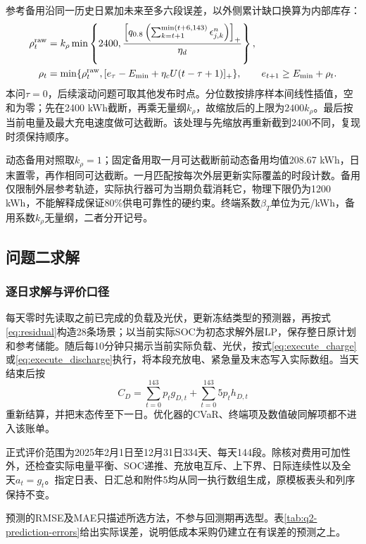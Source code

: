 参考备用沿同一历史日累加未来至多六段误差，以外侧累计缺口换算为内部库存：
\begin{align}
 \rho_t^{\rm raw}
 &=k_\rho\min\left\{2400,
 \frac{\left[q_{0.8}\left(\sum_{k=t+1}^{\min(t+6,143)}
             \epsilon^n_{j,k}\right)\right]_+}{\eta_d}\right\},
 \label{eq:reserve}\\
 \rho_t&=\min\{\rho_t^{\rm raw},
 [e_\tau-E_{\min}+\eta_cU(t-\tau+1)]_+\},\qquad
 e_{t+1}\ge E_{\min}+\rho_t.
 \label{eq:reachable_reserve}
\end{align}
本问$\tau=0$，后续滚动问题可取其他发布时点。分位数按排序样本间线性插值，空和为零；先在2400 kWh截断，再乘无量纲$k_\rho$，故缩放后的上限为$2400k_\rho$。最后按当前电量及最大充电速度做可达截断。该处理与先缩放再重新截到2400不同，复现时须保持顺序。

动态备用对照取$k_\rho=1$；固定备用取一月可达截断前动态备用均值208.67 kWh，日末置零，再作相同可达截断。一月匹配按每次外层更新实际覆盖的时段计数。备用仅限制外层参考轨迹，实际执行器可为当期负载消耗它，物理下限仍为1200 kWh，不能解释成保证80\%供电可靠性的硬约束。终端系数$\beta_T$单位为元/kWh，备用系数$k_\rho$无量纲，二者分开记号。

\subsection{问题二求解}

\subsubsection{逐日求解与评价口径}

每天零时先读取之前已完成的负载及光伏，更新冻结类型的预测器，再按式\eqref{eq:residual}构造28条场景；以当前实际SOC为初态求解外层LP，保存整日原计划和参考储能。随后每10分钟只揭示当前实际负载、光伏，按式\eqref{eq:execute_charge}或\eqref{eq:execute_discharge}执行，将本段充放电、紧急量及末态写入实际数组。当天结束后按
\begin{equation}
 C_D=\sum_{t=0}^{143}p_tg_{D,t}+\sum_{t=0}^{143}5p_th_{D,t}
 \label{eq:q2_actual_bill}
\end{equation}
重新结算，并把末态传至下一日。优化器的CVaR、终端项及数值破同解项都不进入该账单。

正式评价范围为2025年2月1日至12月31日334天、每天144段。除核对费用可加性外，还检查实际电量平衡、SOC递推、充放电互斥、上下界、日际连续性以及全天$a_t=g_t$。指定日表、日汇总和附件5均从同一执行数组生成，原模板表头和列序保持不变。

预测的RMSE及MAE只描述所选方法，不参与回测期再选型。表\ref{tab:q2-prediction-errors}给出实际误差，说明低成本采购仍建立在有误差的预测之上。


